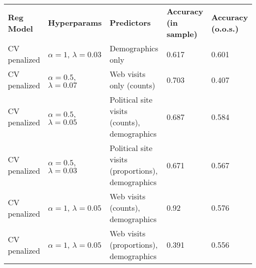 \begin{table}
\small
    \begin{tabular}{lllll}
    \textbf{Reg Model}  & \textbf{Hyperparams}                             & \textbf{Predictors}                                        & \textbf{Accuracy (in sample)} & \textbf{Accuracy (o.o.s.)} \\
    CV penalized & $\alpha = 1$, $\lambda = 0.03$ & Demographics only                                 & 0.617                & 0.601                    \\
    CV penalized & $\alpha = 0.5$, $\lambda = 0.07$ &  Web visits only (counts)                          & 0.703                & 0.407                    \\
    CV penalized & $\alpha = 0.5$, $\lambda = 0.05$ &  Political site visits (counts), demographics      & 0.687                & 0.584                    \\
    CV penalized & $\alpha = 0.5$, $\lambda = 0.03$ &  Political site visits (proportions), demographics & 0.671                & 0.567                    \\
    CV penalized & $\alpha = 1$, $\lambda = 0.05$ &  Web visits (counts), demographics                 & 0.92                 & 0.576                    \\
    CV penalized & $\alpha = 1$, $\lambda = 0.05$ &  Web visits (proportions), demographics            & 0.391                & 0.556                    \\
    \end{tabular}
\end{table}
